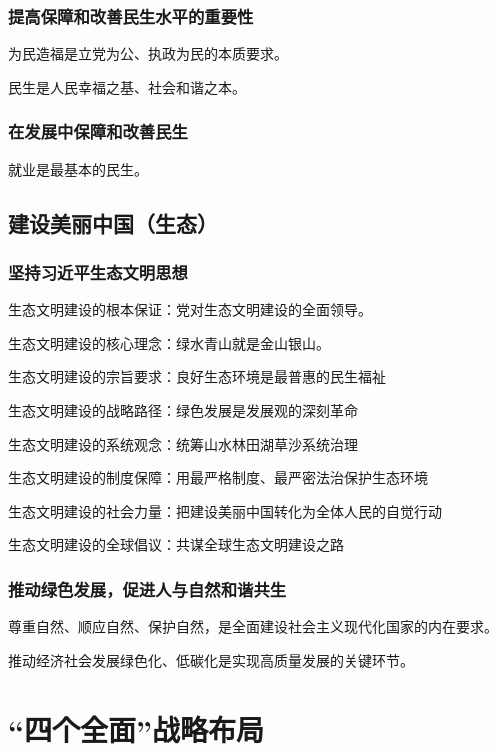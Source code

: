\documentclass[12pt, a4paper, oneside]{ctexart}
\begin{document}
\subsubsection{提高保障和改善民生水平的重要性}

为民造福是立党为公、执政为民的本质要求。

民生是人民幸福之基、社会和谐之本。

\subsubsection{在发展中保障和改善民生}

就业是最基本的民生。

\subsection{建设美丽中国（生态）}

\subsubsection{坚持习近平生态文明思想}

生态文明建设的根本保证：党对生态文明建设的全面领导。

生态文明建设的核心理念：绿水青山就是金山银山。

生态文明建设的宗旨要求：良好生态环境是最普惠的民生福祉

生态文明建设的战略路径：绿色发展是发展观的深刻革命

生态文明建设的系统观念：统筹山水林田湖草沙系统治理

生态文明建设的制度保障：用最严格制度、最严密法治保护生态环境

生态文明建设的社会力量：把建设美丽中国转化为全体人民的自觉行动

生态文明建设的全球倡议：共谋全球生态文明建设之路

\subsubsection{推动绿色发展，促进人与自然和谐共生}

尊重自然、顺应自然、保护自然，是全面建设社会主义现代化国家的内在要求。

推动经济社会发展绿色化、低碳化是实现高质量发展的关键环节。

\section{“四个全面”战略布局}
\end{document}
